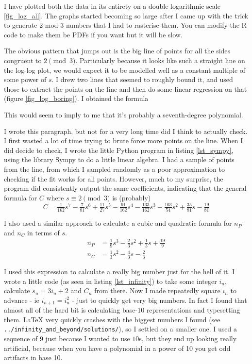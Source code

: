 I have plotted both the data in its entirety on a double logarithmic scale
\ref{fig_log_all}. The graphs started becoming so large after I came up with the
trick to generate 2-mod-3 numbers that I had to rasterise them. You can modify
the R code to make them be PDFs if you want but it will be slow.

The obvious pattern that jumps out is the big line of points for all the sides
congruent to \(2 \pmod 3\). Particularly because it looks like such a straight
line on the log-log plot, we would expect it to be modelled well as a constant
multiple of some power of \(s\). I drew two lines that seemed to roughly bound
it, and used those to extract the points on the line and then do some linear
regression on that (figure \ref{fig_log_boring}). I obtained the formula

This would seem to imply to me that it's probably a seventh-degree polynomial.

I wrote this paragraph, but not for a very long time did I think to actually
check. I first wasted a lot of time trying to brute force more points on the
line. When I did decide to check, I wrote the little Python program in listing
\ref{lst_sympy}, using the library Sympy to do a little linear algebra. I had a
sample of points from the line, from which I sampled randomly as a poor
approximation to checking if the fit works for all points. However, much to my
surprise, the program did consistently output the same coefficients, indicating
that the general formula for \(C\) where \(s \equiv 2 \pmod 3\) is (probably)
\begin{equation*}
C = \tfrac{1}{162}s^7 - \tfrac{7}{81}s^6 + \tfrac{11}{27}s^5 - \tfrac{91}{162}s^4
    - \tfrac{133}{162}s^3 + \tfrac{103}{54}s^2 + \tfrac{35}{81}s - \tfrac{19}{81}
\end{equation*}

I also used a similar approach to calculate a cubic and quadratic formula for
\(n_P\) and \(n_C\) in terms of \(s\).
\begin{align*}
n_P &= \tfrac 19s^3 - \tfrac 23s^2 + \tfrac 13s + \tfrac{19}9 \\
n_C &= \tfrac 13s^2 - \tfrac 43s - \tfrac 23
\end{align*}

I used this expression to calculate a really big number just for the hell of it.
I wrote a little code (as seen in listing \ref{lst_infinity}) to take some
integer \(i_n\), calculate \(s_n = 3i_n + 2\) and \(C_n\) from there. Now I made
repeatedly square \(i_n\) to advance - ie \(i_{n + 1} = i_n^2\) - just to
quickly get very big numbers. In fact I found that almost all of the hard bit is
calculating base-10 representations and typesetting them. \LaTeX{} very quickly
crashes with the biggest numbers I found (see
\texttt{../infinity\_and\_beyond/solutions/}), so I settled on a smaller one.
I used a sequence of \(9\) just because I wanted to use \(10\)s, but they end up
looking really artificial, because when you have a polynomial in a power of 10
you get odd artifacts in base 10.

